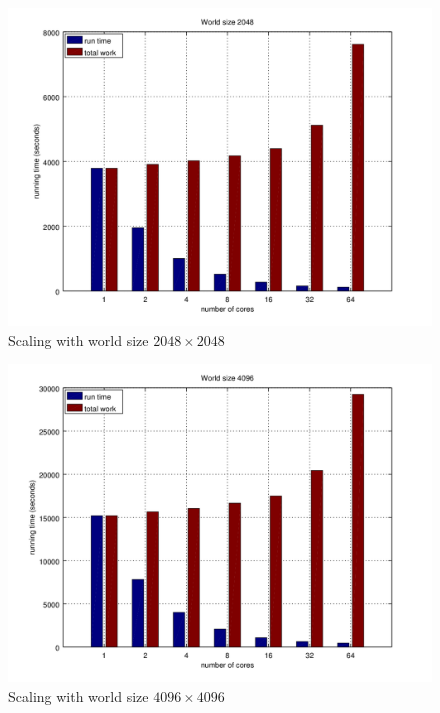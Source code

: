 \documentclass[a4paper]{article}
\begin{document}
\begin{figure}
    \centering
    \includegraphics[width=\textwidth]{scaling-2048}
    \caption{Scaling with world size $2048 \times 2048$}
\end{figure}

\begin{figure}
    \centering
    \includegraphics[width=\textwidth]{scaling-4096}
    \caption{Scaling with world size $4096 \times 4096$}
\end{figure}
\end{document}
